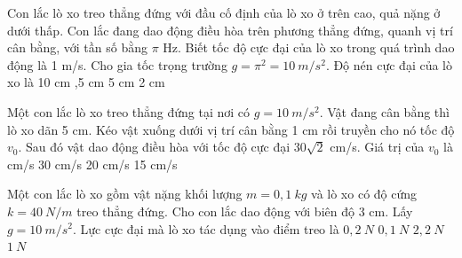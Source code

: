 \begin{ex}%
Con lắc lò xo treo thẳng đứng với đầu cố định của lò xo ở trên cao, quả nặng ở dưới thấp. Con lắc đang dao động điều hòa trên phương thẳng đứng, quanh vị trí cân bằng, với tần số bằng $\pi$ Hz. Biết tốc độ cực đại của lò xo trong quá trình dao động là 1 m/s. Cho gia tốc trọng trường $g = \pi^2 = 10\ m/s^2$. Độ nén cực đại của lò xo là
\choice
{10 cm}
{,5 cm}
{5 cm}
{2 cm}
\end{ex} 
\begin{ex}%
Một con lắc lò xo treo thẳng đứng tại nơi có $g = 10\ m/s^2$. Vật đang cân bằng thì lò xo dãn 5 cm. Kéo vật xuống dưới vị trí cân bằng 1 cm rồi truyền cho nó tốc độ $v_0$. Sau đó vật dao động điều hòa với tốc độ cực đại $30\sqrt{2}$ cm/s. Giá trị của $v_0$ là
\choice
{ cm/s}
{30 cm/s}
{20 cm/s}
{15 cm/s}
\end{ex} 
\begin{ex}%
Một con lắc lò xo gồm vật nặng khối lượng $m=0,1\ kg$ và lò xo có độ cứng $k=40\ N/m$ treo thẳng đứng. Cho con lắc dao động với biên độ 3 cm. Lấy $g=10\ m/s^2.$ Lực cực đại mà lò xo tác dụng vào điểm treo là
\choice
{$0,2\ N$}
{$0,1\ N$}
{\True $2,2\ N$}
{$1\ N$}
\end{ex} 
